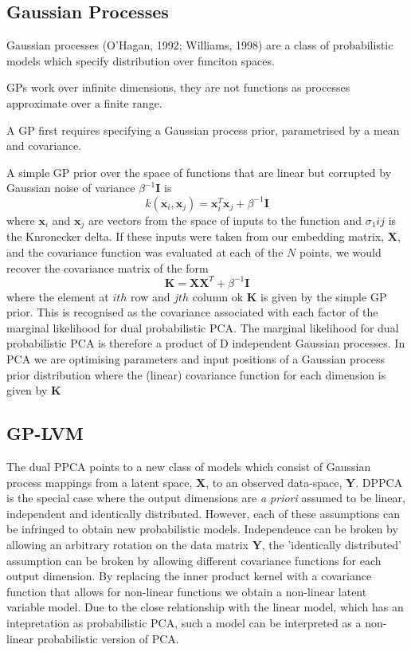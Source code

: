 \documentclass[ %
                    author={Dillon Keith Diep},
                supervisor={Dr. Carl Henrik Ek},
                    degree={MEng},
                     title={Assisted Content Generation for 3D Hair Geometry},
                  subtitle={[INCOMPLETE DRAFT, CONTAINS NOTES FROM RESEARCH]},
                      type={Research},
                      year={2014} ]{dissertation}
\begin{document}
\subsection{Gaussian Processes}
Gaussian processes (O'Hagan, 1992; Williams, 1998) are a class of probabilistic models which specify distribution over funciton spaces.

GPs work over infinite dimensions, they are not functions as processes approximate over a finite range.

A GP first requires specifying a Gaussian process prior, parametrised by a mean and covariance.

A simple GP prior over the space of functions that are linear but corrupted by Gaussian noise of variance $\beta^{-1}\mathbf{I}$ is
\begin{equation}
	k(\mathbf{x}_i,\mathbf{x}_j)=\mathbf{x}^T_i\mathbf{x}_j+\beta^{-1}\mathbf{I}
\end{equation}
where $\mathbf{x}_i$ and $\mathbf{x}_j$ are vectors from the space of inputs to the function and $\sigma_1{ij}$ is the Knronecker delta. If these inputs were taken from our embedding matrix, $\mathbf{X}$, and the covariance function was evaluated at each of the $N$ points, we would recover the covariance matrix of the form
\begin{equation}
	\mathbf{K=XX}^T+\beta^{-1}\mathbf{I}
\end{equation}
where the element at $ith$ row and $jth$ column ok $\mathbf{K}$ is given by the simple GP prior. This is recognised as the covariance associated with each factor of the marginal likelihood for dual probabilistic PCA. The marginal likelihood for dual probabilistic PCA is therefore a product of D independent Gaussian processes. In PCA we are optimising parameters and input positions of a Gaussian process prior distribution where the (linear) covariance function for each dimension is given by $\mathbf{K}$

\subsection{GP-LVM}

The dual PPCA points to a new class of models which consist of Gaussian process mappings from a latent space, $\mathbf{X}$, to an observed data-space, $\mathbf{Y}$. DPPCA is the special case where the output dimensions are \textit{a priori} assumed to be linear, independent and identically distributed. However, each of these assumptions can be infringed to obtain new probabilistic models. Independence can be broken by allowing an arbitrary rotation on the data matrix $\mathbf{Y}$, the 'identically distributed' assumption can be broken by allowing different covariance functions for each output dimension. By replacing the inner product kernel with a covariance function that allows for non-linear functions we obtain a non-linear latent variable model. Due to the close relationship with the linear model, which has an intepretation as probabilistic PCA, such a model can be interpreted as a non-linear probabilistic version of PCA.
\end{document}
